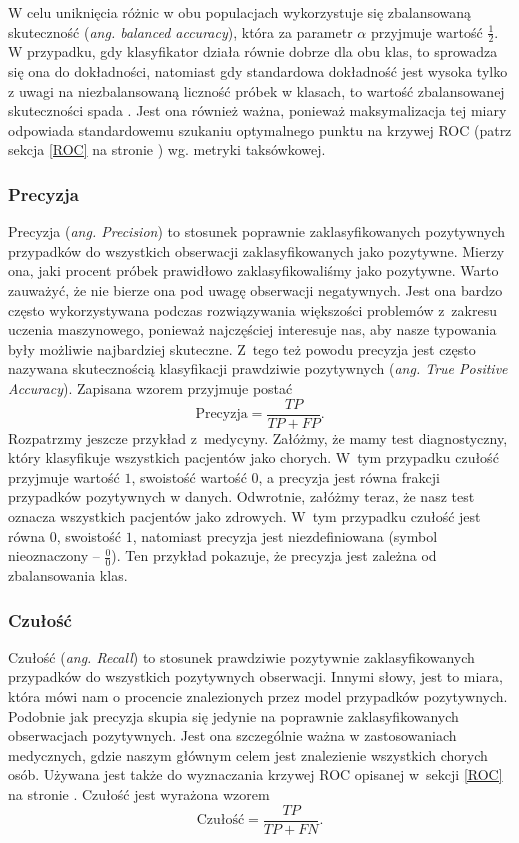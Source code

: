 \documentclass[inzynierska]{pwr_wmat_praca_dyplomowa}
\theoremstyle{plain}
\numberwithin{theorem}{chapter}
\theoremstyle{definition}
\numberwithin{theorem}{chapter}
\begin{document}
W celu uniknięcia różnic w obu populacjach wykorzystuje się zbalansowaną skuteczność (\textit{ang. balanced accuracy}), która za parametr $\alpha$ przyjmuje wartość $\frac{1}{2}$. W przypadku, gdy klasyfikator działa równie dobrze dla obu klas, to sprowadza się ona do dokładności, natomiast gdy standardowa dokładność jest wysoka tylko z uwagi na niezbalansowaną liczność próbek w klasach, to wartość zbalansowanej skuteczności spada \cite{balanced_accuracy}. Jest ona również ważna, ponieważ maksymalizacja tej miary odpowiada standardowemu szukaniu optymalnego punktu na krzywej ROC (patrz sekcja \ref{ROC} na stronie \pageref{ROC}) wg. metryki taksówkowej.

\subsubsection{Precyzja}
Precyzja (\textit{ang. Precision}) to stosunek poprawnie zaklasyfikowanych pozytywnych przypadków do wszystkich obserwacji zaklasyfikowanych jako pozytywne. Mierzy ona, jaki procent próbek prawidłowo zaklasyfikowaliśmy jako pozytywne. Warto zauważyć, że nie bierze ona pod uwagę obserwacji negatywnych. Jest ona bardzo często wykorzystywana podczas rozwiązywania większości problemów z~zakresu uczenia maszynowego, ponieważ najczęściej interesuje nas, aby nasze typowania były możliwie najbardziej skuteczne. Z~tego też powodu precyzja jest często nazywana skutecznością klasyfikacji prawdziwie pozytywnych (\textit{ang. True Positive Accuracy}). Zapisana wzorem przyjmuje postać
$$ \text{Precyzja} = \frac{TP}{TP + FP} \text{.}$$
Rozpatrzmy jeszcze przykład z~medycyny. Załóżmy, że mamy test diagnostyczny, który klasyfikuje wszystkich pacjentów jako chorych. W~tym przypadku czułość przyjmuje wartość $1$, swoistość wartość $0$, a precyzja jest równa frakcji przypadków pozytywnych w danych. Odwrotnie, załóżmy teraz, że nasz test oznacza wszystkich pacjentów jako zdrowych. W~tym przypadku czułość jest równa $0$, swoistość $1$, natomiast precyzja jest niezdefiniowana (symbol nieoznaczony -- $\frac{0}{0}$). Ten przykład pokazuje, że precyzja jest zależna od zbalansowania klas.

\subsubsection{Czułość}
Czułość (\textit{ang. Recall}) to stosunek prawdziwie pozytywnie zaklasyfikowanych przypadków do wszystkich pozytywnych obserwacji. Innymi słowy, jest to miara, która mówi nam o procencie znalezionych przez model przypadków pozytywnych. Podobnie jak precyzja skupia się jedynie na poprawnie zaklasyfikowanych obserwacjach pozytywnych. Jest ona szczególnie ważna w zastosowaniach medycznych, gdzie naszym głównym celem jest znalezienie wszystkich chorych osób. Używana jest także do wyznaczania krzywej ROC opisanej w~sekcji \ref{ROC} na stronie \pageref{ROC}. Czułość jest wyrażona wzorem
$$ \text{Czułość}= \frac{TP}{TP + FN} \text{.}$$
\end{document}
